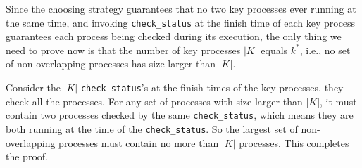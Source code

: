 \documentclass[12pt,letterpaper]{article}
\begin{document}
Since the choosing strategy guarantees that no two key processes ever running at the same time, and invoking \texttt{check\_status} at the finish time of each key process guarantees each process being checked during its execution, the only thing we need to prove now is that the number of key processes $|K|$ equals $k^*$, i.e., no set of non-overlapping processes has size larger than $|K|$.

Consider the $|K|$ \texttt{check\_status}'s at the finish times of the key processes, they check all the processes. For any set of processes with size larger than $|K|$, it must contain two processes checked by the same \texttt{check\_status}, which means they are both running at the time of the \texttt{check\_status}. So the largest set of non-overlapping processes must contain no more than $|K|$ processes. This completes the proof.
\end{document}

